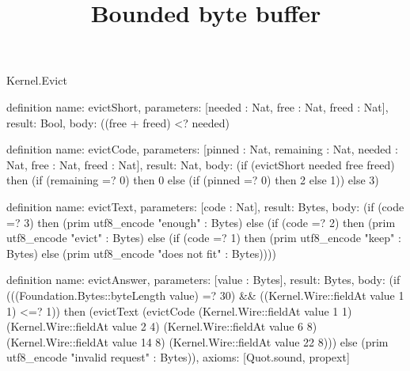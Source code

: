 \begin{lexlean}{Kernel.Evict}
\title{Bounded byte buffer}
\begin{semanticmodule}
definition{
  name: evictShort,
  parameters: [needed : Nat, free : Nat, freed : Nat],
  result: Bool,
  body: ((free + freed) <? needed)
}

definition{
  name: evictCode,
  parameters: [pinned : Nat, remaining : Nat, needed : Nat, free : Nat, freed : Nat],
  result: Nat,
  body: (if (evictShort needed free freed) then (if (remaining =? 0) then 0 else (if (pinned =? 0) then 2 else 1)) else 3)
}

definition{
  name: evictText,
  parameters: [code : Nat],
  result: Bytes,
  body: (if (code =? 3) then (prim utf8_encode "enough" : Bytes) else (if (code =? 2) then (prim utf8_encode "evict" : Bytes) else (if (code =? 1) then (prim utf8_encode "keep" : Bytes) else (prim utf8_encode "does not fit" : Bytes))))
}

definition{
  name: evictAnswer,
  parameters: [value : Bytes],
  result: Bytes,
  body: (if (((Foundation.Bytes::byteLength value) =? 30) && ((Kernel.Wire::fieldAt value 1 1) <=? 1)) then (evictText (evictCode (Kernel.Wire::fieldAt value 1 1) (Kernel.Wire::fieldAt value 2 4) (Kernel.Wire::fieldAt value 6 8) (Kernel.Wire::fieldAt value 14 8) (Kernel.Wire::fieldAt value 22 8))) else (prim utf8_encode "invalid request" : Bytes)),
  axioms: [Quot.sound, propext]
}
\end{semanticmodule}
\end{lexlean}
